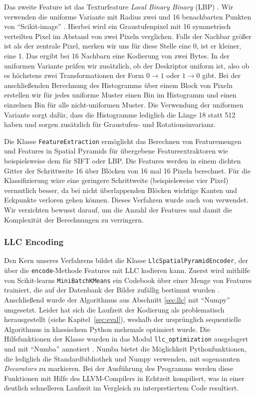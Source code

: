 Das zweite Feature ist das Texturfeature \emph{Local Binary Binary} (LBP) \cite{oph94}. Wir verwenden die uniforme Variante mit Radius zwei und 16 benachbarten Punkten von \enquote{Scikit-image} \cite{skimg}. Hierbei wird ein Graustufenpixel mit 16 symmetrisch verteilten Pixel im Abstand von zwei Pixeln verglichen. Falls der Nachbar größer ist als der zentrale Pixel, merken wir uns für diese Stelle eine 0, ist er kleiner, eine 1. Das ergibt bei 16 Nachbarn eine Kodierung von zwei Bytes. In der uniformen Variante prüfen wir zusätzlich, ob der Deskriptor uniform ist, also ob es höchstens zwei Transformationen der Form $0 \rightarrow 1$ oder $1 \rightarrow 0$ gibt. Bei der anschließenden Berechnung des Histogramms über einem Block von Pixeln erstellen wir für jedes uniforme Muster einen Bin im Histogramm und einen einzelnen Bin für alle nicht-uniformen Muster. Die Verwendung der uniformen Variante sorgt dafür, dass die Histogramme lediglich die Länge 18 statt 512 haben und sorgen zusätzlich für Graustufen- und Rotationsinvarianz. 

Die Klasse \texttt{FeatureExtraction} ermöglicht das Berechnen von Featuremengen und Features in Spatial Pyramids für übergebene Featureextraktoren wie beispielsweise dem für SIFT oder LBP. Die Features werden in einem dichten Gitter der Schrittweite 16 über Blöcken von 16 mal 16 Pixeln berechnet. Für die Klassifizierung wäre eine geringere Schrittweite (beispielsweise vier Pixel) vermutlich besser, da bei nicht überlappenden Blöcken wichtige Kanten und Eckpunkte verloren gehen können. Dieses Verfahren wurde auch von \cite{ywkjwh13} verwendet. Wir verzichten bewusst darauf, um die Anzahl der Features und damit die Komplexität der Berechnungen zu verringern.

\subsubsection{LLC Encoding}

Den Kern unseres Verfahrens bildet die Klasse \texttt{LlcSpatialPyramidEncoder}, der über die \texttt{encode}-Methode Features mit LLC kodieren kann. Zuerst wird mithilfe von Scikit-learns \texttt{MiniBatchKMeans} ein Codebook über einer Menge von Features trainiert, die auf der Datenbank der Bilder zufällig bestimmt wurden \cite{sklearn}. Anschließend wurde der Algorithmus aus Abschnitt \ref{sec:llc} mit \enquote{Numpy} umgesetzt. Leider hat sich die Laufzeit der Kodierung als problematisch herausgestellt (siehe Kapitel~\ref{sec:eval}), weshalb der ursprünglich sequentielle Algorithmus in klassischem Python mehrmals optimiert wurde. Die Hilfsfunktionen der Klasse wurden in das Modul \texttt{llc\_optimization} ausgelagert und mit \enquote{Numba} annotiert \cite{numba}. Numba bietet die Möglichkeit Pythonfunktionen, die lediglich die Standardbibliothek und Numpy verwenden, mit sogenannten \emph{Decorators} zu markieren. Bei der Ausführung des Programms werden diese Funktionen mit Hilfe des LLVM-Compilers in Echtzeit kompiliert, was in einer deutlich schnelleren Laufzeit im Vergleich zu interpretiertem Code resultiert. 


